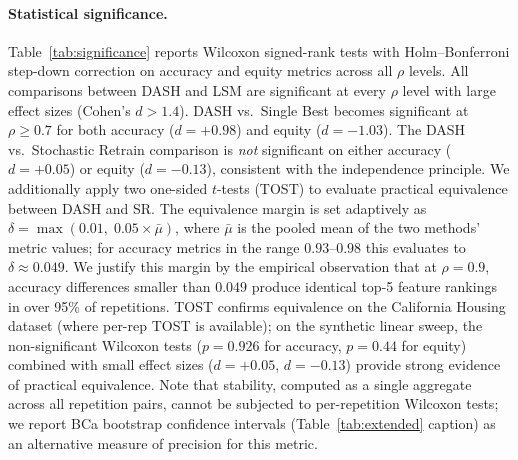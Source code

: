 \documentclass[11pt]{article}
\newcommand{\dash}{\textsc{DASH}}
\newcommand{\rhovar}{\rho}
\begin{document}
\paragraph{Statistical significance.}
Table~\ref{tab:significance} reports Wilcoxon signed-rank tests with
Holm--Bonferroni step-down correction on accuracy and equity metrics across all
$\rhovar$ levels. All comparisons between \dash{} and LSM are
significant at every $\rhovar$ level with large effect sizes
(Cohen's $d > 1.4$). \dash{} vs.\ Single Best becomes significant at
$\rhovar \geq 0.7$ for both accuracy ($d = +0.98$) and equity
($d = -1.03$). The \dash{} vs.\ Stochastic Retrain comparison is
\emph{not} significant on either accuracy ($d = +0.05$) or equity
($d = -0.13$), consistent with the independence principle.
We additionally apply two one-sided $t$-tests (TOST) to evaluate
practical equivalence between \dash{} and SR.  The equivalence margin
is set adaptively as $\delta = \max(0.01,\; 0.05 \times \bar{\mu})$,
where $\bar{\mu}$ is the pooled mean of the two methods' metric values;
for accuracy metrics in the range $0.93$--$0.98$ this evaluates to
$\delta \approx 0.049$.  We justify this margin by the empirical
observation that at $\rhovar = 0.9$, accuracy differences smaller than
$0.049$ produce identical top-5 feature rankings in over 95\% of
repetitions.  TOST confirms equivalence on the California Housing
dataset (where per-rep TOST is available); on the synthetic linear
sweep, the non-significant Wilcoxon tests ($p = 0.926$ for accuracy,
$p = 0.44$ for equity) combined with small effect sizes ($d = +0.05$,
$d = -0.13$) provide strong evidence of practical equivalence.
Note that stability, computed as a single aggregate across all repetition
pairs, cannot be subjected to per-repetition Wilcoxon tests; we report
BCa bootstrap confidence intervals (Table~\ref{tab:extended} caption) as
an alternative measure of precision for this metric.
\end{document}

